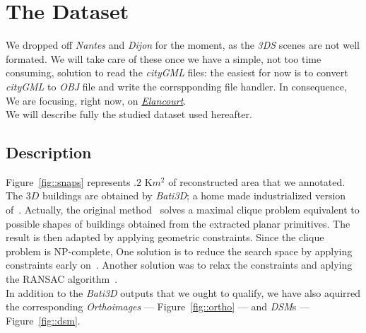 \documentclass[../main.tex]{subfiles}
\begin{document}
    \section{The Dataset}

    We dropped off \textit{Nantes} and \textit{Dijon} for the moment, as the \textit{3DS} scenes are not well formated. We will take care of these once we have a simple, not too time consuming, solution to read the \textit{cityGML} files: the easiest for now is to convert \textit{cityGML} to \textit{OBJ} file and write the corrspponding file handler. In consequence, We are focusing, right now, on \href{https://www.google.fr/maps/place/%C3%89lancourt/@48.7781732,1.9536264,5868m/data=!3m1!1e3!4m13!1m7!3m6!1s0x47e68370e965167b:0x705d83a4167c877c!2s%C3%89lancourt!3b1!8m2!3d48.782907!4d1.960077!3m4!1s0x47e68370e965167b:0x705d83a4167c877c!8m2!3d48.782907!4d1.960077}{\textit{Elancourt}}.\\

    We will describe fully the studied dataset used hereafter.

    \subsection{Description}

    Figure~\ref{fig::snaps} represents $.2\text{ K}m^2$ of reconstructed area that we annotated. The $3D$ buildings are obtained by \textit{Bati3D}; a home made industrialized version of~\cite{durupt2006automatic, taillandier2004automatic, taillandier2005}. Actually, the original method~\cite{taillandier2004automatic} solves a maximal clique problem equivalent to possible shapes of buildings obtained from the extracted planar primitives. The result is then adapted by applying geometric constraints. Since the clique problem is NP-complete, One solution is to reduce the search space by applying constraints early on~\cite{taillandier2005}. Another solution was to relax the constraints and aplying the RANSAC algorithm~\cite{Fischler:1981:RSC:358669.358692}.\\

    In addition to the \textit{Bati3D} outputs that we ought to qualify, we have also aquirred the corresponding \textit{Orthoimages} --- Figure~\ref{fig::ortho} --- and \textit{DSM}s --- Figure~\ref{fig::dsm}.
\end{document}
